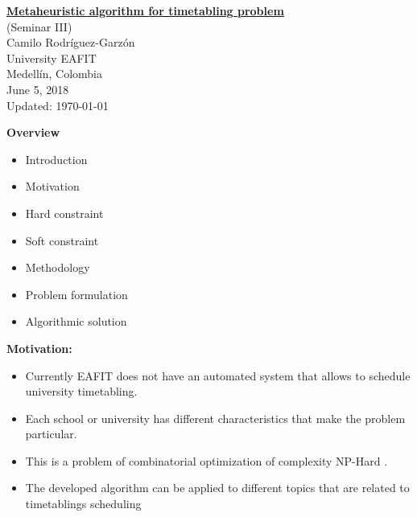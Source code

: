 \documentclass[centering]{report}
\newenvironment{slide}
    {\newpage
    \vspace*{\fill}
    }
    { 
     \vspace*{\fill}
    }
\begin{document}
\Huge %

\setcounter{chapter}{1}
\setcounter{section}{1}

\newpage
\thispagestyle{empty}
\vspace*{\fill}
\begin{center}
  {\Huge{\underline{\textbf{Metaheuristic algorithm for timetabling problem}}}} \\[4mm]
  {\Huge{(Seminar III)}} \\[10mm]
  {\Huge{Camilo Rodríguez-Garzón}} \\[10mm]
  {\Huge University EAFIT}\\
  {\Huge Medellín, Colombia}\\[20mm]
  {\Huge June 5, 2018}\\
  {\LARGE\color{gray} Updated: \today}
\end{center}
\vspace*{\fill}

\begin{slide}
\textbf{Overview}\\
\begin{itemize}
    \item Introduction
    \item Motivation
    \item Hard constraint
    \item Soft constraint
    \item Methodology
    \item Problem formulation
    \item Algorithmic solution
\end{itemize}
\end{slide}

\begin{slide}
\textbf{Motivation:}\\

\begin{itemize}
\item Currently EAFIT does not have an automated system that allows to schedule university timetabling.
\item Each school or university has different characteristics that make the problem particular.
\item This is a problem of combinatorial optimization of complexity NP-Hard \cite {Abdelhalim2016}.
\item The developed algorithm can be applied to different topics that are related to timetablings scheduling
\end{itemize}

\end{slide}
\end{document}
